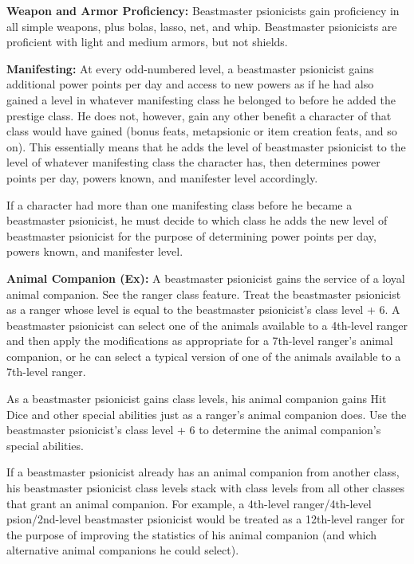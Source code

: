 {
\textbf{Weapon and Armor Proficiency:} Beastmaster psionicists gain proficiency in all simple weapons, plus bolas, lasso, net, and whip. Beastmaster psionicists are proficient with light and medium armors, but not shields.

\textbf{Manifesting:} At every odd-numbered level, a beastmaster psionicist gains additional power points per day and access to new powers as if he had also gained a level in whatever manifesting class he belonged to before he added the prestige class. He does not, however, gain any other benefit a character of that class would have gained (bonus feats, metapsionic or item creation feats, and so on). This essentially means that he adds the level of beastmaster psionicist to the level of whatever manifesting class the character has, then determines power points per day, powers known, and manifester level accordingly.

If a character had more than one manifesting class before he became a beastmaster psionicist, he must decide to which class he adds the new level of beastmaster psionicist for the purpose of determining power points per day, powers known, and manifester level.

\textbf{Animal Companion (Ex):} A beastmaster psionicist gains the service of a loyal animal companion. See the ranger class feature. Treat the beastmaster psionicist as a ranger whose level is equal to the beastmaster psionicist's class level + 6. A beastmaster psionicist can select one of the animals available to a 4th-level ranger and then apply the modifications as appropriate for a 7th-level ranger's animal companion, or he can select a typical version of one of the animals available to a 7th-level ranger.

As a beastmaster psionicist gains class levels, his animal companion gains Hit Dice and other special abilities just as a ranger's animal companion does. Use the beastmaster psionicist's class level + 6 to determine the animal companion's special abilities.

If a beastmaster psionicist already has an animal companion from another class, his beastmaster psionicist class levels stack with class levels from all other classes that grant an animal companion. For example, a 4th-level ranger/4th-level psion/2nd-level beastmaster psionicist would be treated as a 12th-level ranger for the purpose of improving the statistics of his animal companion (and which alternative animal companions he could select).

}
